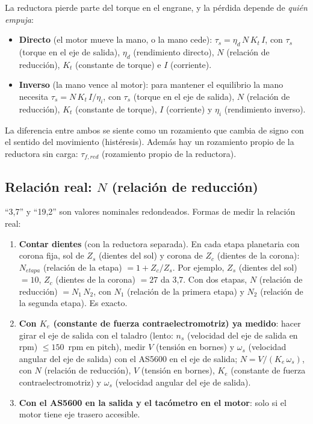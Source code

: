 \documentclass[11pt,a4paper]{article}
\begin{document}
La reductora pierde parte del torque en el engrane, y la pérdida depende de \emph{quién empuja}:
\begin{itemize}
\item \textbf{Directo} (el motor mueve la mano, o la mano cede): $\tau_s = \eta_d\,N\,K_t\,I$, con $\tau_s$ (torque en el eje de salida), $\eta_d$ (rendimiento directo), $N$ (relación de reducción), $K_t$ (constante de torque) e $I$ (corriente).
\item \textbf{Inverso} (la mano vence al motor): para mantener el equilibrio la mano necesita $\tau_s = N\,K_t\,I / \eta_i$, con $\tau_s$ (torque en el eje de salida), $N$ (relación de reducción), $K_t$ (constante de torque), $I$ (corriente) y $\eta_i$ (rendimiento inverso).
\end{itemize}
La diferencia entre ambos se siente como un rozamiento que cambia de signo con el sentido del movimiento (histéresis). Además hay un rozamiento propio de la reductora sin carga: $\tau_{f,red}$ (rozamiento propio de la reductora).

\subsection{Relación real: $N$ (relación de reducción)}
\label{sec:relacion}

``3,7'' y ``19,2'' son valores nominales redondeados. Formas de medir la relación real:
\begin{enumerate}
\item \textbf{Contar dientes} (con la reductora separada). En cada etapa planetaria con corona fija, sol de $Z_s$ (dientes del sol) y corona de $Z_c$ (dientes de la corona): $N_{etapa}$ (relación de la etapa) $= 1 + Z_c/Z_s$. Por ejemplo, $Z_s$ (dientes del sol) $= 10$, $Z_c$ (dientes de la corona) $= 27$ da 3,7. Con dos etapas, $N$ (relación de reducción) $= N_1\,N_2$, con $N_1$ (relación de la primera etapa) y $N_2$ (relación de la segunda etapa). Es exacto.
\item \textbf{Con $K_e$ (constante de fuerza contraelectromotriz) ya medido}: hacer girar el eje de salida con el taladro (lento: $n_s$ (velocidad del eje de salida en rpm) $\le 150$~rpm en pitch), medir $V$ (tensión en bornes) y $\omega_s$ (velocidad angular del eje de salida) con el AS5600 en el eje de salida; $N = V/(K_e\,\omega_s)$, con $N$ (relación de reducción), $V$ (tensión en bornes), $K_e$ (constante de fuerza contraelectromotriz) y $\omega_s$ (velocidad angular del eje de salida).
\item \textbf{Con el AS5600 en la salida y el tacómetro en el motor}: solo si el motor tiene eje trasero accesible.
\end{enumerate}
\end{document}
